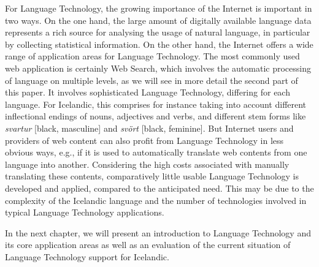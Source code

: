 \documentclass{../../metanetpaper}
\begin{document}
\begin{multicols}{2}
For Language Technology, the growing importance of the Internet is important in two ways. On the one hand, the large amount of digitally available language data represents a rich source for analysing the usage of natural language, in particular by collecting statistical information. On the other hand, the Internet offers a wide range of application areas for Language Technology. 
The most commonly used web application is certainly Web Search, which involves the automatic processing of language on multiple levels, as we will see in more detail the second part of this paper. It involves sophisticated Language Technology, differing for each language. For Icelandic, this comprises for instance taking into account different inflectional endings of nouns, adjectives and verbs, and different stem forms like \textit{svartur} {[}black, masculine{]} and \textit{svört} {[}black, feminine{]}. But Internet users and providers of web content can also profit from Language Technology in less obvious ways, e.g., if it is used to automatically translate web contents from one language into another. Considering the high costs associated with manually translating these contents, comparatively little usable Language Technology is developed and applied, compared to the anticipated need. This may be due to the complexity of the Icelandic language and the number of technologies involved in typical Language Technology applications. 

In the next chapter, we will present an introduction to Language Technology and its core application areas as well as an evaluation of the current situation of Language Technology support for Icelandic.
\end{multicols}

\clearpage

\end{document}
